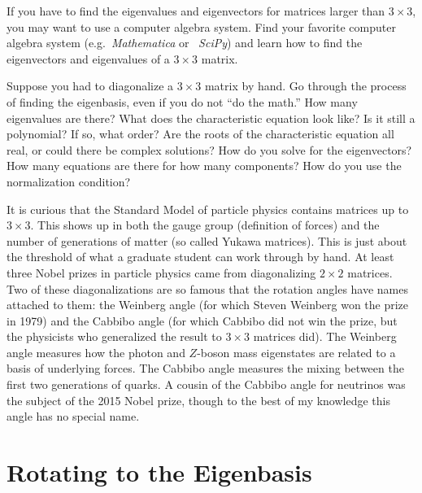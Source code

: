 \documentclass[12pt, oneside]{report}    %
\let\oldsection\section
\def\section{%
  \setcounter{sidenote}{1}%
  \oldsection
}
\begin{document}
\begin{exercise}
If you have to find the eigenvalues and eigenvectors for matrices larger than $3\times 3$, you may want to use a computer algebra system. Find your favorite computer algebra system (e.g.~\emph{Mathematica} or ~\emph{SciPy}) and learn how to find the eigenvectors and eigenvalues of a $3\times 3$ matrix. 
\end{exercise}

\begin{exercise}
Suppose you had to diagonalize a $3\times 3$ matrix by hand. Go through the process of finding the eigenbasis, even if you do not ``do the math.'' How many eigenvalues are there? What does the characteristic equation look like? Is it still a polynomial? If so, what order? Are the roots of the characteristic equation all real, or could there be complex solutions? How do you solve for the eigenvectors? How many equations are there for how many components? How do you use the normalization condition? 
\end{exercise}

\begin{example}
It is curious that the Standard Model of particle physics contains matrices up to $3\times 3$. This shows up in both the gauge group (definition of forces) and the number of generations of matter (so called Yukawa matrices). This is just about the threshold of what a graduate student can work through by hand. At least three Nobel prizes in particle physics came from diagonalizing $2\times 2$ matrices. Two of these diagonalizations are so famous that the rotation angles have names attached to them: the Weinberg angle (for which Steven Weinberg won the prize in 1979) and the Cabbibo angle (for which Cabbibo did not win the prize, but the physicists who generalized the result to $3\times 3$ matrices did). The Weinberg angle measures how the photon and $Z$-boson mass eigenstates are related to a basis of underlying forces. The Cabbibo angle measures the mixing between the first two generations of quarks. A cousin of the Cabbibo angle for neutrinos was the subject of the 2015 Nobel prize, though to the best of my knowledge this angle has no special name.
\end{example}

\section{Rotating to the Eigenbasis}
\label{sec:rotation:to:eigenbasis}
\end{document}
